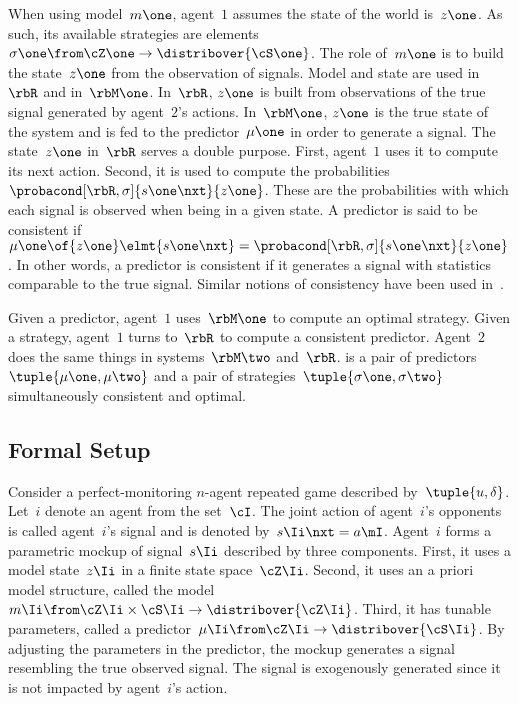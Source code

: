When using model~\(m\one\), agent~\(1\) assumes the state of the world is~\(z\one\).
As such, its available strategies are elements~\(\sigma\one \from \cZ\one \to \distribover{\cS\one}\).
The role of~\(m\one\) is to build the state~\(z\one\) from the observation of signals.
Model and state are used in~\(\rbR\) and in~\(\rbM\one\).
In~\(\rbR\), \(z\one\) is built from observations of the true signal generated by agent~\(2\)'s actions.
In~\(\rbM\one\), \(z\one\) is the true state of the system and is fed to the predictor~\(\mu\one\) in order to generate a signal.
The state~\(z\one\) in~\(\rbR\) serves a double purpose.
First, agent~\(1\) uses it to compute its next action.
Second, it is used to compute the probabilities~\(\probacond[\rbR,\sigma]{s\one\nxt}{z\one}\).
These are the probabilities with which each signal is observed when being in a given state.
A predictor is said to be consistent if~\(\mu\one \of{z\one} \elmt{s\one\nxt} = \probacond[\rbR,\sigma]{s\one\nxt}{z\one}\).
In other words, a predictor is consistent if it generates a signal with statistics comparable to the true signal.
Similar notions of consistency have been used in~\cite{sandroni_smorodinsky:2004,eyster_piccione:2011}.

Given a predictor, agent~\(1\) uses~\(\rbM\one\) to compute an optimal strategy.
Given a strategy, agent~\(1\) turns to~\(\rbR\) to compute a consistent predictor.
Agent~\(2\) does the same things in systems~\(\rbM\two\) and~\(\rbR\).
 is a pair of predictors~\(\tuple{\mu\one, \mu\two}\) and a pair of strategies~\(\tuple{\sigma\one, \sigma\two}\) simultaneously consistent and optimal.

\subsection{Formal Setup}

Consider a perfect-monitoring \(n\)-agent repeated game described by~\(\tuple{u, \delta}\).
Let~\(i\) denote an agent from the set~\(\cI\).
The joint action of agent~\(i\)'s opponents is called agent~\(i\)'s signal and is denoted by~\(s\Ii\nxt = a\mI\).
Agent~\(i\) forms a parametric mockup of signal~\(s\Ii\) described by three components.
First, it uses a model state~\(z\Ii\) in a finite state space~\(\cZ\Ii\).
Second, it uses an a priori model structure, called the model~\(m\Ii \from \cZ\Ii \times \cS\Ii \to \distribover{\cZ\Ii}\).
Third, it has tunable parameters, called a predictor~\(\mu\Ii \from \cZ\Ii \to \distribover{\cS\Ii}\).
By adjusting the parameters in the predictor, the mockup generates a signal resembling the true observed signal.
The signal is exogenously generated since it is not impacted by agent~\(i\)'s action.

